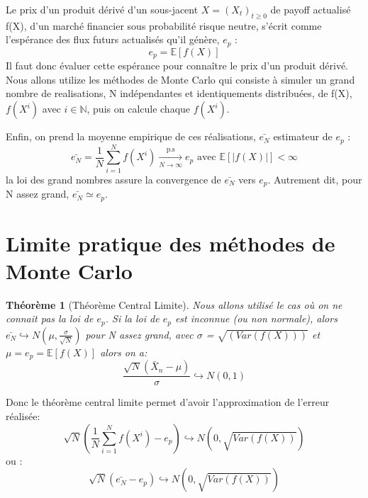 \documentclass[12pt]{report}
\newtheorem{theo}{Théorème}[section]
\begin{document}
Le prix d'un produit dérivé d'un sous-jacent $X=(X_t)_{t\geq0}$ de payoff actualisé f(X), d'un marché financier sous probabilité risque neutre, s’écrit
comme l’espérance des flux futurs actualisés qu’il génère, $e_p$ :
\begin{equation}
	e_p = \mathbb{E}[f(X)]
\end{equation}
Il faut donc évaluer cette espérance pour connaître le prix d’un produit dérivé.
Nous allons utilize les méthodes de Monte Carlo qui consiste à simuler un grand
nombre de realisations, N indépendantes et identiquements distribuées, de f(X),
$f(X^i)$ avec $i\in \mathbb{N}$, puis on calcule chaque $f(X^i)$.

Enfin, on prend la moyenne empirique de ces réalisations, $\bar{e_N}$ estimateur de $e_p$ :
\begin{equation}
	\bar{e_N}=\frac{1}{N}\sum_{i=1}^{N} f(X^i) \xrightarrow[N\rightarrow{\infty}]{\text{p.s}} e_p \text{~avec~} \mathbb{E}[|f(X)|]<\infty
\end{equation}
la loi des grand nombres assure la convergence de $\bar{e_N}$ vers $e_p$.
Autrement dit, pour N assez grand, $\bar{e_N} \simeq e_p$.

\section{Limite pratique des méthodes de Monte Carlo}

\begin{theo}[Théorème Central Limite]\label{TCL}
	Nous allons utilisé le cas où on ne connait pas la loi de $e_p$.
	Si la loi de $e_p$ est inconnue (ou non normale), alors $\bar{e_N}\hookrightarrow N(\mu,\frac{\sigma}{\sqrt{N}})$ pour N assez grand, avec $\sigma$ = $\sqrt{(Var(f(X)))}$  et $\mu=e_p =\mathbb{E}[f(X)]$  alors on a:
	\begin{equation}
		\frac{\sqrt{N}(\bar{X}_n-\mu)}{\sigma}\hookrightarrow N(0,1)
	\end{equation}
\end{theo}

Donc le théorème central limite permet d'avoir l'approximation de l'erreur réalisée:
\begin{equation}
	\label{eq:approximation-erreur}
	\sqrt{N}(\frac{1}{N}\sum_{i=1}^{N}f(X^i)-e_p)\hookrightarrow N(0,\sqrt{Var(f(X))})
\end{equation}
ou :
\begin{equation}
	\sqrt{N}(\bar{e_N}-e_p)\hookrightarrow N(0,\sqrt{Var(f(X))})
\end{equation}
\end{document}
